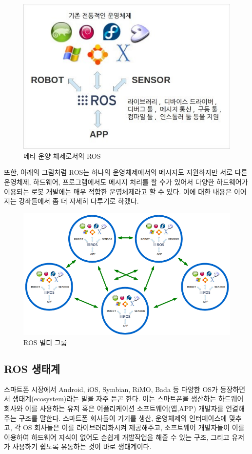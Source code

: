 \begin{figure}[h]
\centering\includegraphics[width=0.7\columnwidth]{pictures/chapter1/ros_is_not_os.jpg}
\caption{메타 운양 체제로서의 ROS}
\end{figure}

또한, 아래의 그림처럼 ROS는 하나의 운영체제에서의 메시지도 지원하지만 서로 다른 운영체제, 하드웨어, 프로그램에서도 메시지 처리를 할 수가 있어서 다양한 하드웨어가 이용되는 로봇 개발에는 매우 적합한 운영체제라고 할 수 있다.
이에 대한 내용은 이어지는 강좌들에서 좀 더 자세히 다루기로 하겠다.  

\begin{figure}[h]
\centering\includegraphics[width=0.9\columnwidth]{pictures/chapter1/rosmulti.png}
\caption{ROS 멀티 그룹}
\end{figure}

\subsection{ROS 생태계}

스마트폰 시장에서 Android, iOS,  Symbian, RiMO, Bada 등 다양한 OS가 등장하면서 생태계(ecosystem)라는 말을 자주 듣곤 한다.
이는 스마트폰을 생산하는 하드웨어 회사와 이를 사용하는 유저 혹은 어플리케이션 소프트웨어(앱,APP) 개발자를 연결해주는 구조를 말한다.
스마트폰 회사들이 기기를 생산, 운영체제의 인터페이스에 맞추고, 각 OS 회사들은 이를 라이브러리화시켜 제공해주고, 소프트웨어 개발자들이 이를 이용하여 하드웨어 지식이 없어도 손쉽게 개발작업을 해줄 수 있는 구조, 그리고 유저가 사용하기 쉽도록 유통하는 것이 바로 생태계이다. 


